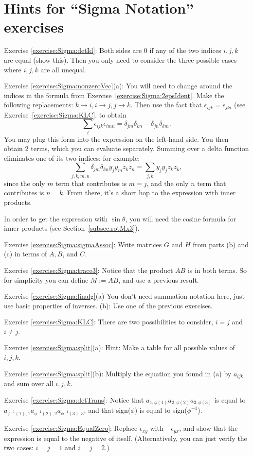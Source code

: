 \section{Hints for ``Sigma Notation'' exercises}\label{sec:sigma:hints} 

\noindent Exercise \ref{exercise:Sigma:detId}: Both sides are 0 if any of the two indices $i,j,k$ are equal (show this). Then you only need to consider the three possible cases where $i,j,k$ are all unequal.

\noindent Exercise \ref{exercise:Sigma:nonzeroVec}(a): You will need to change around the indices in the formula from Exercise~\ref{exercise:Sigma:2epsIdent}. Make the following replacements: $k \rightarrow i, i \rightarrow j, j \rightarrow k$.  Then use the fact that $\epsilon_{ijk}= \epsilon_{jki}$ (see Exercise~\ref{exercise:Sigma:KLC}.  to obtain
\[\sum_i \epsilon_{ijk} \epsilon_{imn} = \delta_{jm} \delta_{kn} - \delta_{jn} \delta_{km}. \]
You may plug this form into the expression on the left-hand side. You then obtain 2 terms, which you can evaluate separately. Summing over a delta function eliminates one of its two indices: for example:
\[ \sum_{j,k,m,n} \delta_{jm} \delta_{kn}  y_j y_m z_k z_n  = \sum_{j,k} y_j y_j z_k z_k, \]
since the only $m$ term that contributes is $m=j$, and the only $n$ term that contributes is $n=k$. From there, it's a short hop to the expression with inner products.

In order to get the expression with $\sin \theta$, you will need the cosine formula for inner products (see Section~\ref{subsec:rotMx3}).

\noindent Exercise \ref{exercise:Sigma:sigmaAssoc}: Write matrices $G$ and $H$ from parts (b) and (c) in terms of $A,B$, and $C$.

\noindent Exercise \ref{exercise:Sigma:trace3}: Notice that the product ${AB}$ is in both terms. So for simplicity you can define $M := AB$, and use a previous result.

\noindent Exercise \ref{exercise:Sigma:linalg}(a) You don't need summation notation here, just use basic properties of inverses. (b): Use one of the previous exercises.

\noindent Exercise \ref{exercise:Sigma:KLC}: There are two possibilities to consider, $i=j$ and $i \neq j$.

\noindent Exercise \ref{exercise:Sigma:split}(a): Hint: Make a table for all possible values of $i,j,k$.

\noindent Exercise \ref{exercise:Sigma:split}(b): Multiply the equation you found in (a) by $a_{ijk}$ and sum over all $i,j,k$.


\noindent Exercise \ref{exercise:Sigma:detTrans}: Notice that $a_{1, \phi(1)} a_{2, \phi(2)} a_{3, \phi(3)}$ is equal to $a_{\phi^{-1}(1), 1} a_{\phi^{-1}(2), 2} a_{\phi^{-1}(3), 3}$, and that sign($\phi$) is equal to sign($\phi^{-1}$). 

\noindent Exercise \ref{exercise:Sigma:EqualZero}: Replace $\epsilon_{xy}$ with $-\epsilon_{yx}$, and show that the expression is equal to the negative of itself. (Alternatively, you can just verify the two cases:  $i=j=1$ and $i=j=2$.)


